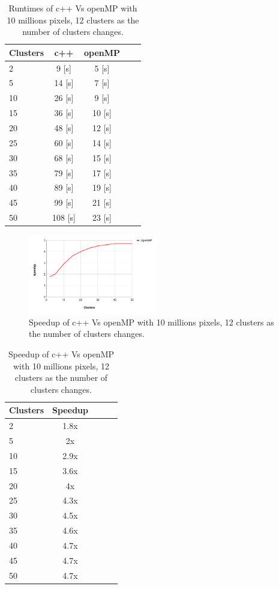 \documentclass[10pt,twocolumn,letterpaper]{article}
\begin{document}
\begin{table}[H]
\begin{center}
\begin{tabular}{|l|c|c|c|c|}
\hline
Clusters & c++ & openMP \\
\hline\hline
2 & 9 [s] & 5 [s] \\
5 & 14 [s] & 7 [s] \\
10 & 26 [s] & 9 [s] \\
15 & 36 [s] & 10 [s] \\
20 & 48 [s] & 12 [s] \\
25 & 60 [s] & 14 [s] \\
30 & 68 [s] & 15 [s] \\
35 & 79 [s] & 17 [s] \\
40 & 89 [s] & 19 [s] \\
45 & 99 [s] & 21 [s] \\
50 & 108 [s] & 23 [s] \\

\hline
\end{tabular}
\end{center}
\caption{Runtimes of c++ Vs openMP with 10 millions pixels, 12 clusters as the number of clusters changes.}
\end{table}

\begin{figure}[H]
\begin{center}
\includegraphics[width=0.5\textwidth]{latex/6s.png}
\caption{Speedup of c++ Vs openMP with 10 millions pixels, 12 clusters as the number of clusters changes.}
\label{etichetta}
\end{center}
\end{figure}



\begin{table}[H]
\begin{center}
\begin{tabular}{|l|c|c|c|c|}
\hline
Clusters & Speedup\\
\hline\hline
2 & 1.8x\\
5 & 2x\\
10 & 2.9x\\
15 & 3.6x\\
20 & 4x\\
25 & 4.3x\\
30 & 4.5x\\
35 & 4.6x\\
40 & 4.7x\\
45 & 4.7x\\
50 & 4.7x\\
\hline
\end{tabular}
\end{center}
\caption{Speedup of c++ Vs openMP with 10 millions pixels, 12 clusters as the number of clusters changes.}
\end{table}
\end{document}

